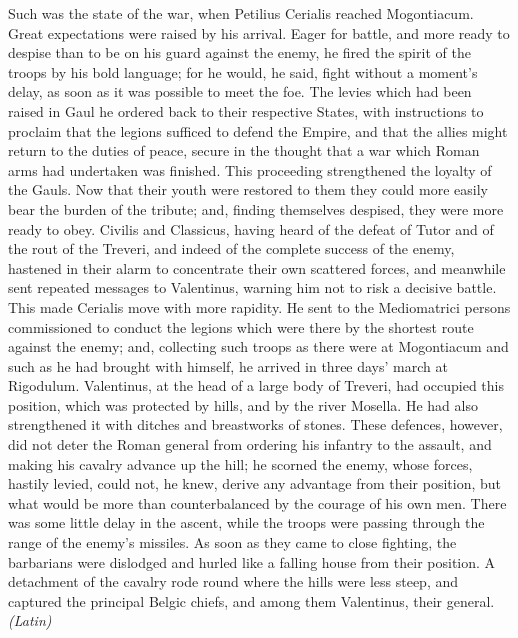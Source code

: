 
Such was the state of the war, when Petilius Cerialis reached Mogontiacum. Great expectations were raised by his arrival. Eager for battle, and more ready to despise than to be on his guard against the enemy, he fired the spirit of the troops by his bold language; for he would, he said, fight without a moment's delay, as soon as it was possible to meet the foe. The levies which had been raised in Gaul he ordered back to their respective States, with instructions to proclaim that the legions sufficed to defend the Empire, and that the allies might return to the duties of peace, secure in the thought that a war which Roman arms had undertaken was finished. This proceeding strengthened the loyalty of the Gauls. Now that their youth were restored to them they could more easily bear the burden of the tribute; and, finding themselves despised, they were more ready to obey. Civilis and Classicus, having heard of the defeat of Tutor and of the rout of the Treveri, and indeed of the complete success of the enemy, hastened in their alarm to concentrate their own scattered forces, and meanwhile sent repeated messages to Valentinus, warning him not to risk a decisive battle. This made Cerialis move with more rapidity. He sent to the Mediomatrici persons commissioned to conduct the legions which were there by the shortest route against the enemy; and, collecting such troops as there were at Mogontiacum and such as he had brought with himself, he arrived in three days' march at Rigodulum. Valentinus, at the head of a large body of Treveri, had occupied this position, which was protected by hills, and by the river Mosella. He had also strengthened it with ditches and breastworks of stones. These defences, however, did not deter the Roman general from ordering his infantry to the assault, and making his cavalry advance up the hill; he scorned the enemy, whose forces, hastily levied, could not, he knew, derive any advantage from their position, but what would be more than counterbalanced by the courage of his own men. There was some little delay in the ascent, while the troops were passing through the range of the enemy's missiles. As soon as they came to close fighting, the barbarians were dislodged and hurled like a falling house from their position. A detachment of the cavalry rode round where the hills were less steep, and captured the principal Belgic chiefs, and among them Valentinus, their general. \emph{(Latin)}


